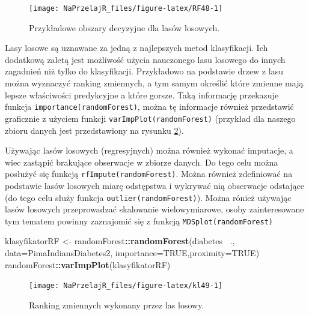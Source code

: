 \documentclass[polish,]{book}
\newenvironment{Shaded}{\begin{snugshade}}{\end{snugshade}}
\newcommand{\DataTypeTok}[1]{\textcolor[rgb]{0.13,0.29,0.53}{#1}}
\newcommand{\KeywordTok}[1]{\textcolor[rgb]{0.13,0.29,0.53}{\textbf{#1}}}
\newcommand{\NormalTok}[1]{#1}
\newcommand{\OperatorTok}[1]{\textcolor[rgb]{0.81,0.36,0.00}{\textbf{#1}}}
\newcommand{\OtherTok}[1]{\textcolor[rgb]{0.56,0.35,0.01}{#1}}
\newcommand{\StringTok}[1]{\textcolor[rgb]{0.31,0.60,0.02}{#1}}
\begin{document}
\begin{figure}[h]

{\centering \texttt{[image: NaPrzelajR\_files/figure-latex/RF48-1]} 

}

\caption{Przykładowe obszary decyzyjne dla lasów losowych.}\label{fig:RF48}
\end{figure}

Lasy losowe są uznawane za jedną z najlepszych metod klasyfikacji. Ich dodatkową zaletą jest możliwość użycia nauczonego lasu losowego do innych zagadnień niż
tylko do klasyfikacji. Przykładowo na podstawie drzew z lasu można wyznaczyć ranking zmiennych, a tym samym określić które zmienne mają lepsze właściwości predykcyjne a które gorsze. Taką informację przekazuje funkcja \texttt{importance(randomForest)},
można tę informacje również przedstawić graficznie z użyciem funkcji \texttt{varImpPlot(randomForest)}
(przykład dla naszego zbioru danych jest przedstawiony na rysunku \ref{fig:kl49}).

Używając lasów losowych (regresyjnych) można również wykonać imputacje,
a wiec zastąpić brakujące obserwacje w zbiorze danych. Do tego celu można posłużyć się funkcją \texttt{rfImpute(randomForest)}. Można również zdefiniować na podstawie
lasów losowych miarę odstępstwa i wykrywać nią obserwacje odstające (do tego celu służy funkcja \texttt{outlier(randomForest)}). Można rónież używając lasów losowych
przeprowadzać skalowanie wielowymiarowe, osoby zainteresowane tym tematem powinny zaznajomić się z funkcją \texttt{MDSplot(randomForest)}

\begin{Shaded}
\begin{Highlighting}[]
\NormalTok{klasyfikatorRF <-}\StringTok{ }\NormalTok{randomForest}\OperatorTok{::}\KeywordTok{randomForest}\NormalTok{(diabetes}\OperatorTok{~}\StringTok{ }\NormalTok{.,}
                                             \DataTypeTok{data=}\NormalTok{PimaIndiansDiabetes2,}
                                             \DataTypeTok{importance=}\OtherTok{TRUE}\NormalTok{,}\DataTypeTok{proximity=}\OtherTok{TRUE}\NormalTok{)}
\NormalTok{randomForest}\OperatorTok{::}\KeywordTok{varImpPlot}\NormalTok{(klasyfikatorRF)}
\end{Highlighting}
\end{Shaded}

\begin{figure}[h]

{\centering \texttt{[image: NaPrzelajR\_files/figure-latex/kl49-1]} 

}

\caption{Ranking zmiennych wykonany przez las losowy.}\label{fig:kl49}
\end{figure}
\end{document}
